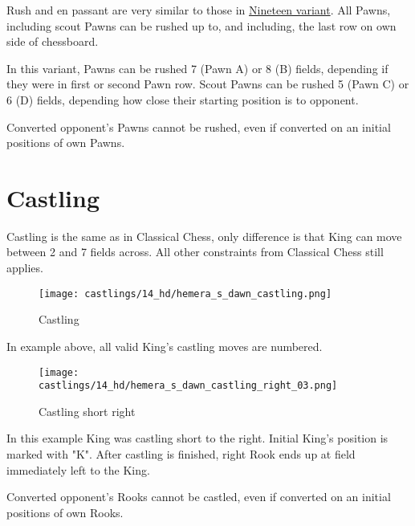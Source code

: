 Rush and en passant are very similar to those in \hyperref[fig:12_nineteen_en_passant]{Nineteen variant}.
All Pawns, including scout Pawns can be rushed up to, and including, the last row on own side of
chessboard.

In this variant, Pawns can be rushed 7 (Pawn A) or 8 (B) fields, depending if they were in first or second
Pawn row. Scout Pawns can be rushed 5 (Pawn C) or 6 (D) fields, depending how close their starting position
is to opponent.

Converted opponent's Pawns cannot be rushed, even if converted on an initial positions
of own Pawns.

\clearpage %

\section*{Castling}

Castling is the same as in Classical Chess, only difference is that King can move between 2 and 7 fields across.
All other constraints from Classical Chess still applies.

\noindent
\begin{figure}[!h]
\texttt{[image: castlings/14\_hd/hemera\_s\_dawn\_castling.png]}
\caption{Castling}
\label{fig:hemera_s_dawn_castling}
\end{figure}

In example above, all valid King's castling moves are numbered.

\noindent
\begin{figure}[!h]
\texttt{[image: castlings/14\_hd/hemera\_s\_dawn\_castling\_right\_03.png]}
\caption{Castling short right}
\label{fig:hemera_s_dawn_castling_right_03}
\end{figure}

In this example King was castling short to the right. Initial King's position is marked with "K".
After castling is finished, right Rook ends up at field immediately left to the King.

Converted opponent's Rooks cannot be castled, even if converted on an initial positions
of own Rooks.

\clearpage %

